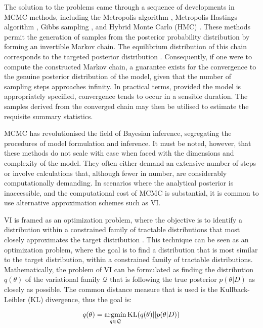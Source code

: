 The solution to the problems came through a sequence of developments in \ac{MCMC} methods, including the Metropolis algorithm \parencite{Rosenbluth1953-gu}, Metropolis-Hastings algorithm \parencite{Hastings1970-mb}, Gibbs sampling \parencite{Geman1984-nk}, and Hybrid Monte Carlo (HMC) \parencite{Duane1987-gu}. These methods permit the generation of samples from the posterior probability distribution by forming an invertible Markov chain. The equilibrium distribution of this chain corresponds to the targeted posterior distribution \parencite{Roberts2004-op}. Consequently, if one were to compute the constructed Markov chain, a guarantee exists for the convergence to the genuine posterior distribution of the model, given that the number of sampling steps approaches infinity. In practical terms, provided the model is appropriately specified, convergence tends to occur in a sensible duration. The samples derived from the converged chain may then be utilised to estimate the requisite summary statistics. 

\ac{MCMC} has revolutionised the field of Bayesian inference, segregating the procedures of model formulation and inference. It must be noted, however, that these methods do not scale with ease when faced with the dimensions and complexity of the model. They often either demand an extensive number of steps or involve calculations that, although fewer in number, are considerably computationally demanding. In scenarios where the analytical posterior is inaccessible, and the computational cost of \ac{MCMC} is substantial, it is common to use alternative approximation schemes such as \ac{VI}.

\acl{VI} is framed as an optimization problem, where the objective is to identify a distribution within a constrained family of tractable distributions that most closely approximates the target distribution \parencite{Blei2017-dm}. This technique can be seen as an optimization problem, where the goal is to find a distribution that is most similar to the target distribution, within a constrained family of tractable distributions. Mathematically, the problem of \acl{VI} can be formulated as finding the distribution $q(\theta)$ of the variational family $\mathcal{Q}$ that is following the true posterior $p(\theta | D)$ as closely as possible. The common distance measure that is used is the Kullback-Leibler (KL) divergence, thus the goal is:

\begin{equation}
q(\theta) = \operatorname*{\arg\!\min}_{q \in \mathcal{Q}} \text{KL}(q(\theta) || p(\theta | D))  
\end{equation}

